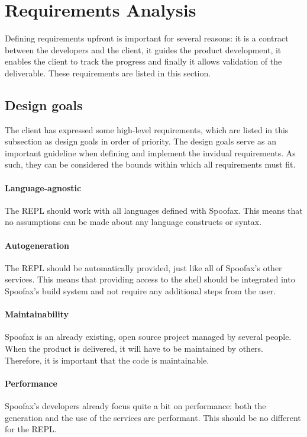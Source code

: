 \section{Requirements Analysis}
\label{sec:requirement-analysis}

Defining requirements upfront is important for several reasons: it is a contract
between the developers and the client, it guides the product development, it
enables the client to track the progress and finally it allows validation of the
deliverable. These requirements are listed in this section.

\subsection{Design goals}
\label{ssec:goals}

The client has expressed some high-level requirements, which are listed in this
subsection as design goals in order of priority. The design goals serve as an
important guideline when defining and implement the invidual requirements. As
such, they can be considered the bounds within which all requirements must fit.

\paragraph{Language-agnostic} The REPL should work with all languages
defined with Spoofax. This means that no assumptions can be made about any
language constructs or syntax.

\paragraph{Autogeneration} The REPL should be automatically provided, just like
all of Spoofax's other services. This means that providing access to the shell
should be integrated into Spoofax's build system and not require any additional
steps from the user.

\paragraph{Maintainability} Spoofax is an already existing, open source project
managed by several people. When the product is delivered, it will have to be
maintained by others. Therefore, it is important that the code is maintainable.

\paragraph{Performance} Spoofax's developers already focus quite a bit on
performance: both the generation and the use of the services are performant.
This should be no different for the REPL.


